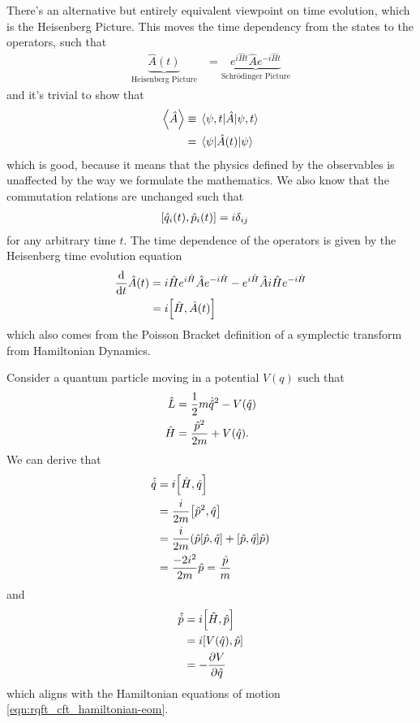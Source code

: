 \documentclass[notes.tex]{subfiles}
\begin{document}
There's an alternative but entirely equivalent viewpoint on time evolution, which is the Heisenberg Picture. This moves the time dependency from the states to the operators, such that
\begin{align*}
    \underbrace{\hat{A}(t)}_{\text{Heisenberg Picture}} &=\underbrace{ e^{i\hat{H}t} \hat{A} e^{-i\hat{H}t}}_{\text{Schr\"odinger Picture}}
\end{align*}
and it's trivial to show that
\begin{align*}
    \expval{\hat{A}} &\equiv \expval{\hat{A}}{\psi, t} \\
    &= \expval{\hat{A}(t)}{\psi}
\end{align*}
which is good, because it means that the physics defined by the observables is unaffected by the way we formulate the mathematics.
We also know that the commutation relations are unchanged such that
\begin{align*}
    \commutator{\hat{q}_i(t)}{\hat{p}_i(t)} &= i\delta_{ij}
\end{align*}
for any arbitrary time $t$.
The time dependence of the operators is given by the Heisenberg time evolution equation
\begin{align*}
    \dv{t}\hat{A}(t) &= i\hat{H} e^{i\hat{H}}\hat{A} e^{-i\hat{H}} - e^{i\hat{H}}\hat{A} i\hat{H} e^{-i\hat{H}} \\
    &= i\commutator{\hat{H}}{\hat{A}(t)}
\end{align*}
which also comes from the Poisson Bracket definition of a symplectic transform from Hamiltonian Dynamics. 

\begin{example}
    Consider a quantum particle moving in a potential $V(q)$ such that
    \begin{align*}
        \hat{L} &= \frac{1}{2}{}m\dot{\hat{q}}^2 - V(\hat{q})\\
        \hat{H} &= \frac{\hat{p}^2}{2m} + V(\hat{q}).
    \end{align*}
    We can derive that
    \begin{align*}
        \hat{\dot{q}} &= i\commutator{\hat{H}}{\hat{q}}\\
        &= \frac{i}{2m}\commutator{\hat{p}^2}{\hat{q}}\\
        &= \frac{i}{2m}\qty(\hat{p}\commutator{\hat{p}}{\hat{q}} + \commutator{\hat{p}}{\hat{q}}\hat{p})\\
        &= \frac{-2i^2}{2m}\hat{p} = \frac{\hat{p}}{m}
    \end{align*}
    and
    \begin{align*}
        \hat{\dot{p}} &= i\commutator{\hat{H}}{\hat{p}}\\
        &= i\commutator{V(\hat{q})}{\hat{p}}\\
        &= -\pdv{V}{\hat{q}}
    \end{align*}
    which aligns with the Hamiltonian equations of motion \autoref{eqn:rqft_cft_hamiltonian-eom}.
\end{example}
\end{document}

